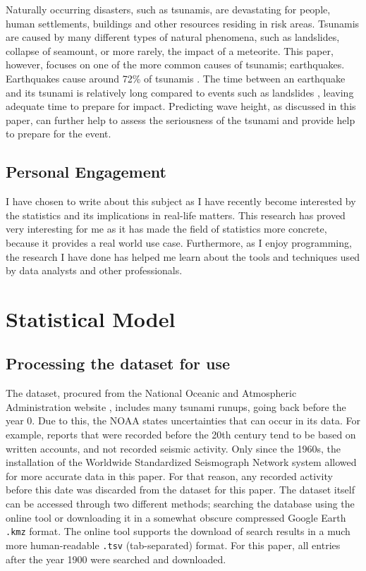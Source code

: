 \documentclass[11pt,letterpaper]{article}
\begin{document}
Naturally occurring disasters, such as tsunamis, are devastating for people, human settlements,
buildings and other resources residing in risk areas. Tsunamis are caused
by many different types of natural phenomena, such as landslides, collapse of
seamount, or more rarely, the impact of a meteorite. This paper, however, focuses
on one of the more common causes of tsunamis; earthquakes. Earthquakes cause around 72\%
of tsunamis \cite{pacifictsunamimuseum}. The time between an earthquake and its tsunami is
relatively long compared to events such as landslides \cite{sue_nokes_walters},
leaving adequate time to prepare for impact. Predicting wave height, as discussed in this
paper, can further help to assess the seriousness of the tsunami and provide help to
prepare for the event.

\subsection{Personal Engagement}

I have chosen to write about this subject as I have recently become interested by the
statistics and its implications in real-life matters. This research has proved very
interesting for me as it has made the field of statistics more concrete, because it provides
a real world use case. Furthermore, as I enjoy programming, the research I have done
has helped me learn about the tools and techniques used by data analysts and other professionals.

\section{Statistical Model}

\subsection{Processing the dataset for use}
The dataset, procured from the National Oceanic and Atmospheric Administration website \cite{noaa}, includes many tsunami
runups, going back before the year 0. Due to this, the NOAA states uncertainties
that can occur in its data. For example, reports that were recorded before the
20th century tend to be based on written accounts, and not recorded seismic activity.
Only since the 1960s, the installation of the Worldwide Standardized Seismograph
Network system allowed for more accurate data in this paper. For that reason, any recorded
activity before this date was discarded from the dataset for this paper. The dataset itself can
be accessed through two different methods; searching the database using the online
tool or downloading it in a somewhat obscure compressed Google Earth \verb|.kmz| format.
The online tool supports the download of search results in a much more human-readable
\verb|.tsv| (tab-separated) format. For this paper, all entries after the year 1900 were searched and downloaded.
\end{document}
